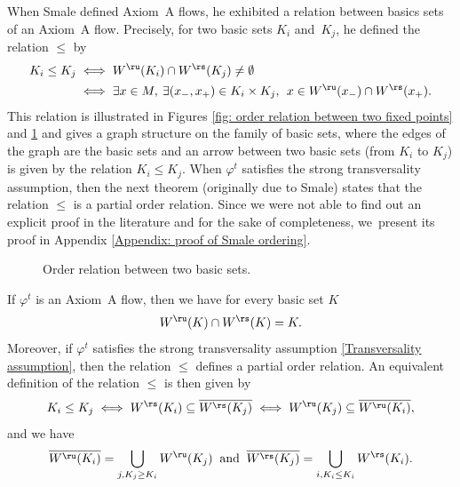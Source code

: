 When Smale \cite{smale} defined Axiom~A flows, he exhibited a relation between basics sets of an Axiom~A flow. Precisely, for two basic sets $K_i$ and~$K_j$, he defined the relation $\leq$ by
\begin{equation}\label{order relation for basic sets}
\begin{split}
K_i \leq K_j &\iff W^\ru (K_i) \cap W^\rs (K_j) \neq \emptyset\\
&\iff \exists x \in M, \: \exists (x_-, x_+) \in K_i \times K_j, \: \: x \in W^\ru (x_-) \cap W^\rs (x_+).
\end{split}
\end{equation}
This relation is illustrated in Figures \ref{fig: order relation between two fixed points} and \ref{fig: order relation between two basic sets} and gives a graph structure on the family of basic sets, where the edges of the graph are the basic sets and an arrow between two basic sets (from $K_i$ to $K_j$) is given by the relation $K_i \leq K_j$. When $\varphi^t$ satisfies the strong transversality assumption, then the next theorem (originally due to Smale) states that the relation $\leq$ is a partial order relation. Since we were not able to find out an explicit proof in the literature and for the sake of completeness, we~present its proof in Appendix \ref{Appendix: proof of Smale ordering}.

\begin{figure}
\begin{minipage}[t]{.49\linewidth}
\def\svgscale{0.3}

\caption{Order relation between two fixed points.}
\label{fig: order relation between two fixed points}
\end{minipage}
\begin{minipage}[t]{.49\linewidth}
\def\svgscale{0.4}

\caption{Order relation between two basic sets.}
\label{fig: order relation between two basic sets}
\end{minipage}
\end{figure}

\begin{thm}\label{thm Smale}
If $\varphi^t$ is an Axiom~A flow, then we have for every basic set $K$
\[
W^\ru (K) \cap W^\rs (K) = K.
\]
Moreover, if $\varphi^t$ satisfies the strong transversality assumption \eqref{Transversality assumption}, then the relation $\leq$ defines a partial order relation. An equivalent definition of the relation $\leq$ is then given by
\begin{equation}\label{eq: thm Smale - equivalence order relation}
K_i \leq K_j \iff W^\rs (K_i) \subseteq \overline{W^\rs (K_j) } \iff W^\ru (K_j) \subseteq \overline{W^\ru (K_i) },
\end{equation}
and we have
\begin{equation}\label{eq: thm Smale - closure of stable and unstable sets}
\overline{W^\ru (K_i) } = \bigcup_{j, K_j \geq K_i} W^\ru (K_j) \: \text{ and } \: \overline{W^\rs (K_j) } = \bigcup_{i, K_i \leq K_i} W^\rs (K_i).
\end{equation}
\end{thm}

